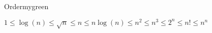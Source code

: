 
\vspace{0.45cm}
\begin{prettyBox}{Order}{mygreen}
\begin{center}
\(1\leq \log(n) \leq \sqrt{n} \leq n \leq n\log(n) \leq n^2 \leq n^3 \leq 2^n \leq n! \leq n^n\)
\end{center}
\end{prettyBox}

